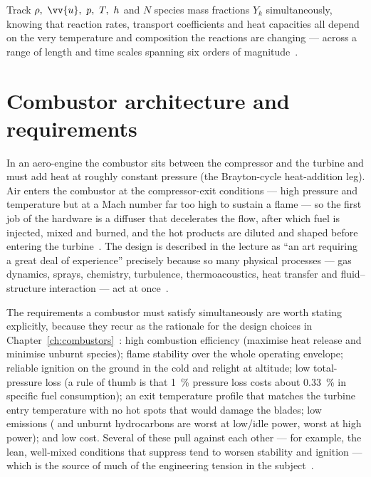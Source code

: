 \begin{keybox}
Track $\rho,\ \vv{u},\ p,\ T,\ h$ and $N$ species mass fractions $Y_k$ simultaneously, knowing that reaction rates, transport coefficients and heat capacities all depend on the very temperature and composition the reactions are changing --- across a range of length and time scales spanning six orders of magnitude~\cite{lecture1,lecture4}.
\end{keybox}

\section{Combustor architecture and requirements}

In an aero-engine the combustor sits between the compressor and the turbine and must add heat at roughly constant pressure (the Brayton-cycle heat-addition leg). Air enters the combustor at the compressor-exit conditions --- high pressure and temperature but at a Mach number far too high to sustain a flame --- so the first job of the hardware is a diffuser that decelerates the flow, after which fuel is injected, mixed and burned, and the hot products are diluted and shaped before entering the turbine~\cite{lecture4}. The design is described in the lecture as ``an art requiring a great deal of experience'' precisely because so many physical processes --- gas dynamics, sprays, chemistry, turbulence, thermoacoustics, heat transfer and fluid--structure interaction --- act at once~\cite{lecture4}.

The requirements a combustor must satisfy simultaneously are worth stating explicitly, because they recur as the rationale for the design choices in Chapter~\ref{ch:combustors}~\cite{lecture4}: high combustion efficiency (maximise heat release and minimise unburnt species); flame stability over the whole operating envelope; reliable ignition on the ground in the cold and relight at altitude; low total-pressure loss (a rule of thumb is that \SI{1}{\percent} pressure loss costs about \SI{0.33}{\percent} in specific fuel consumption); an exit temperature profile that matches the turbine entry temperature with no hot spots that would damage the blades; low emissions ( and unburnt hydrocarbons are worst at low/idle power,  worst at high power); and low cost. Several of these pull against each other --- for example, the lean, well-mixed conditions that suppress  tend to worsen stability and ignition --- which is the source of much of the engineering tension in the subject~\cite{lecture4,lecture13}.

